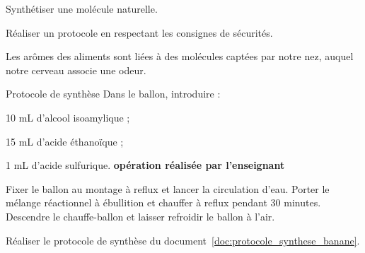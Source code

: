 \sndEnTeteSix

\vspace*{-40pt}

\begin{objectifs}
  \item Synthétiser une molécule naturelle.
  \item Réaliser un protocole en respectant les consignes de sécurités.
\end{objectifs}

\begin{contexte}
  Les arômes des aliments sont liées à des molécules captées par notre nez, auquel notre cerveau associe une odeur.
  
\end{contexte}


\begin{doc}{Protocole de synthèse}
  \label{doc:protocole_synthese_banane}
  Dans le ballon, introduire :
  \begin{listePoints}
    \item 10 mL d'alcool isoamylique ;
    \item 15 mL d'acide éthanoïque ;
    \item 1 mL d'acide sulfurique. \attention \textbf{opération réalisée par l'enseignant} \attention
  \end{listePoints}
  
  Fixer le ballon au montage à reflux et lancer la circulation d'eau.
  Porter le mélange réactionnel à ébullition et chauffer à reflux pendant 30 minutes.
  Descendre le chauffe-ballon et laisser refroidir le ballon à l'air.
\end{doc}

\mesure Réaliser le protocole de synthèse du document~\ref{doc:protocole_synthese_banane}.



